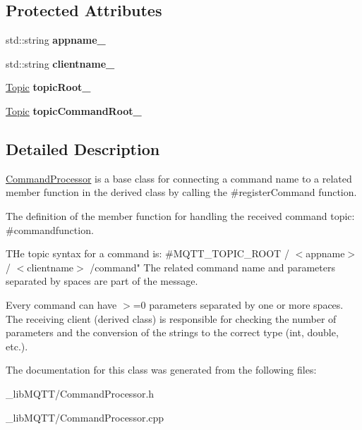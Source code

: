 \subsection*{Protected Attributes}
\begin{DoxyCompactItemize}
\item 
std\+::string {\bfseries appname\+\_\+}\hypertarget{class_command_processor_aab13edb02dbcc123e831e1cce20695a0}{}\label{class_command_processor_aab13edb02dbcc123e831e1cce20695a0}

\item 
std\+::string {\bfseries clientname\+\_\+}\hypertarget{class_command_processor_a3922d658643297c47765181a251b10d3}{}\label{class_command_processor_a3922d658643297c47765181a251b10d3}

\item 
\hyperlink{class_topic}{Topic} {\bfseries topic\+Root\+\_\+}\hypertarget{class_command_processor_a97f0d615c62c8c7e1712522c4577ea53}{}\label{class_command_processor_a97f0d615c62c8c7e1712522c4577ea53}

\item 
\hyperlink{class_topic}{Topic} {\bfseries topic\+Command\+Root\+\_\+}\hypertarget{class_command_processor_ac695d4ff50c2dd91b25c8079b22170e4}{}\label{class_command_processor_ac695d4ff50c2dd91b25c8079b22170e4}

\end{DoxyCompactItemize}


\subsection{Detailed Description}
\hyperlink{class_command_processor}{Command\+Processor} is a base class for connecting a command name to a related member function in the derived class by calling the \#register\+Command function.

The definition of the member function for handling the received command topic\+: \#commandfunction.

T\+He topic syntax for a command is\+: \#\+M\+Q\+T\+T\+\_\+\+T\+O\+P\+I\+C\+\_\+\+R\+O\+OT / $<$appname$>$ / $<$clientname$>$ /command" The related command name and parameters separated by spaces are part of the message.

Every command can have $>$=0 parameters separated by one or more spaces. The receiving client (derived class) is responsible for checking the number of parameters and the conversion of the strings to the correct type (int, double, etc.). 

The documentation for this class was generated from the following files\+:\begin{DoxyCompactItemize}
\item 
\+\_\+lib\+M\+Q\+T\+T/Command\+Processor.\+h\item 
\+\_\+lib\+M\+Q\+T\+T/Command\+Processor.\+cpp\end{DoxyCompactItemize}
